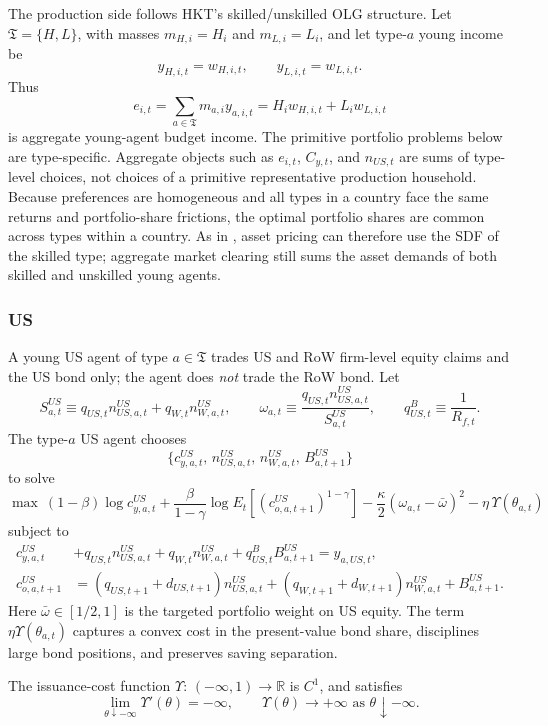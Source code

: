 \documentclass{article}
\begin{document}
The production side follows HKT's skilled/unskilled OLG structure. Let $\mathfrak T=\{H,L\}$, with masses $m_{H,i}=H_i$ and $m_{L,i}=L_i$, and let type-$a$ young income be
\[
y_{H,i,t}=w_{H,i,t},
\qquad
y_{L,i,t}=w_{L,i,t}.
\]
Thus
\[
e_{i,t}=\sum_{a\in\mathfrak T}m_{a,i}y_{a,i,t}=H_iw_{H,i,t}+L_iw_{L,i,t}
\]
is aggregate young-agent budget income. The primitive portfolio problems below are type-specific. Aggregate objects such as $e_{i,t}$, $C_{y,t}$, and $n_{US,t}$ are sums of type-level choices, not choices of a primitive representative production household. Because preferences are homogeneous and all types in a country face the same returns and portfolio-share frictions, the optimal portfolio shares are common across types within a country. As in \citet{hirano2025technological}, asset pricing can therefore use the SDF of the skilled type; aggregate market clearing still sums the asset demands of both skilled and unskilled young agents.

\subsubsection{US}

A young US agent of type $a\in\mathfrak T$ trades US and RoW firm-level equity claims and the US bond only; the agent does \emph{not} trade the RoW bond. Let
\[
S_{a,t}^{US}\equiv q_{US,t}n^{US}_{US,a,t}+q_{W,t}n^{US}_{W,a,t},
\qquad
\omega_{a,t}\equiv\frac{q_{US,t}n^{US}_{US,a,t}}{S_{a,t}^{US}},
\qquad
q^B_{US,t}\equiv \frac{1}{R_{f,t}}.
\]
The type-$a$ US agent chooses
\[
\{c^{US}_{y,a,t},\,n^{US}_{US,a,t},\,n^{US}_{W,a,t},\,B^{US}_{a,t+1}\}
\]
to solve
\[
\max
\ (1-\beta)\log c^{US}_{y,a,t}
+\frac{\beta}{1-\gamma}\log E_t\!\left[(c^{US}_{o,a,t+1})^{1-\gamma}\right]
-\frac{\kappa}{2}(\omega_{a,t}-\bar\omega)^2
-\eta\,\Upsilon(\theta_{a,t})
\]
subject to
\begin{align*}
c^{US}_{y,a,t}
&+q_{US,t}n^{US}_{US,a,t}+q_{W,t}n^{US}_{W,a,t}
+q^B_{US,t}B^{US}_{a,t+1}
= y_{a,US,t},\\
c^{US}_{o,a,t+1}
&=
(q_{US,t+1}+d_{US,t+1})n^{US}_{US,a,t}
+(q_{W,t+1}+d_{W,t+1})n^{US}_{W,a,t}
+B^{US}_{a,t+1}.
\end{align*}
Here $\bar\omega\in[1/2,1]$ is the targeted portfolio weight on US equity. The term $\eta\Upsilon(\theta_{a,t})$ captures a convex cost in the present-value bond share, disciplines large bond positions, and preserves saving separation.

\begin{ass}\label{ass_issuance_costs}
The issuance-cost function $\Upsilon:\,(-\infty,1)\to\mathbb R$ is $C^1$, and satisfies
\[
\lim_{\theta\downarrow -\infty}\Upsilon'(\theta)=-\infty,
\qquad
\Upsilon(\theta)\to+\infty \text{ as } \theta\downarrow -\infty.
\]
\end{ass}
\end{document}

